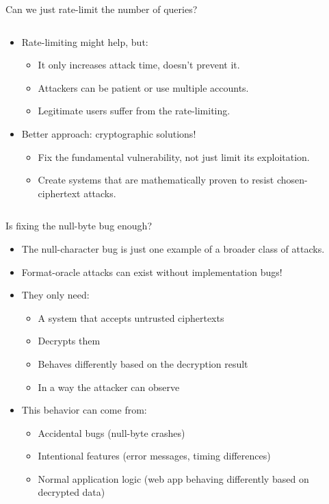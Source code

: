 \documentclass[aspectratio=169, lualatex, handout]{beamer}
\begin{document}
\begin{frame}{Can we just rate-limit the number of queries?}
	\begin{columns}[c]
		\begin{column}{0.6\textwidth}
			\begin{itemize}[<+->]
				\item Rate-limiting might help, but:
				      \begin{itemize}
					      \item It only increases attack time, doesn't prevent it.
					      \item Attackers can be patient or use multiple accounts.
					      \item Legitimate users suffer from the rate-limiting.
				      \end{itemize}
				\item Better approach: cryptographic solutions!
				      \begin{itemize}
					      \item Fix the fundamental vulnerability, not just limit its exploitation.
					      \item Create systems that are mathematically proven to resist chosen-ciphertext attacks.
				      \end{itemize}
			\end{itemize}
		\end{column}
		\begin{column}{0.4\textwidth}
		\end{column}
	\end{columns}
\end{frame}

\begin{frame}{Is fixing the null-byte bug enough?}
	\begin{itemize}[<+->]
		\item The null-character bug is just one example of a broader class of attacks.
		\item Format-oracle attacks can exist without implementation bugs!
		\item They only need:
		      \begin{itemize}[<+->]
			      \item A system that accepts untrusted ciphertexts
			      \item Decrypts them
			      \item Behaves differently based on the decryption result
			      \item In a way the attacker can observe
		      \end{itemize}
		\item This behavior can come from:
		      \begin{itemize}[<+->]
			      \item Accidental bugs (null-byte crashes)
			      \item Intentional features (error messages, timing differences)
			      \item Normal application logic (web app behaving differently based on decrypted data)
		      \end{itemize}
	\end{itemize}
\end{frame}
\end{document}
